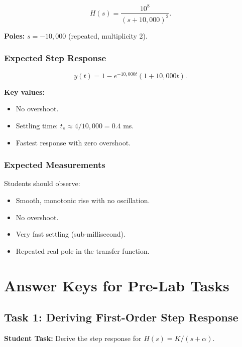 \documentclass[11pt,letterpaper]{article}
\begin{document}
\begin{equation}
H(s) = \frac{10^8}{(s + 10,000)^2}.
\end{equation}

\noindent
\textbf{Poles:} $s = -10,000$ (repeated, multiplicity 2).

\subsubsection*{Expected Step Response}

\begin{equation}
y(t) = 1 - e^{-10,000 t}(1 + 10,000 t).
\end{equation}

\noindent
\textbf{Key values:}
\begin{itemize}
    \item No overshoot.
    \item Settling time: $t_s \approx 4 / 10,000 = 0.4$ ms.
    \item Fastest response with zero overshoot.
\end{itemize}

\subsubsection*{Expected Measurements}

Students should observe:
\begin{itemize}
    \item Smooth, monotonic rise with no oscillation.
    \item No overshoot.
    \item Very fast settling (sub-millisecond).
    \item Repeated real pole in the transfer function.
\end{itemize}

\section{Answer Keys for Pre-Lab Tasks}

\subsection{Task 1: Deriving First-Order Step Response}

\textbf{Student Task:} Derive the step response for $H(s) = K / (s + \alpha)$.
\end{document}
